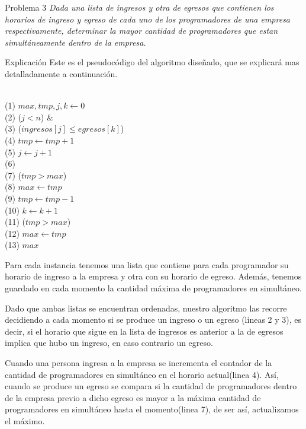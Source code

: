 \begin{section}{Problema 3}
	\textit{Dada una lista de ingresos y otra de egresos que contienen los horarios de ingreso y egreso de cada uno de los programadores de una empresa respectivamente, determinar la mayor cantidad de programadores que estan simultáneamente dentro de la empresa.}
	\begin{subsection}{Explicación}
		Este es el pseudocódigo del algoritmo diseñado, que se explicará mas detalladamente a continuación. 
\\
\\
	\begin{pseudo}
(1)				\tab $max,tmp,j,k \leftarrow 0$ \\
(2)				\tab \WHILE($j< n$) &   \\
(3)				\tab \tab \IF($ingresos[j]\leq egresos[k]$) \\
(4)				\tab \tab \tab $tmp \leftarrow tmp+1$ \\
(5)				\tab \tab \tab $j \leftarrow j+1$ \\
(6)				\tab \tab \ELSE \\
(7)				\tab \tab \tab \IF($tmp>max$) \\
(8)				\tab \tab \tab \tab $max \leftarrow tmp$ \\
(9)				\tab \tab \tab $tmp \leftarrow tmp - 1$ \\				(10)				\tab \tab \tab $k \leftarrow k+1$ \\
(11)				\tab \IF($tmp>max$) \\
(12)				\tab \tab $max \leftarrow tmp$ \\
(13)				\tab \RET $max$
			\end{pseudo}


		Para cada instancia tenemos una lista que contiene para cada programador su horario de ingreso a la empresa y otra con su horario de egreso. Además, tenemos guardado en cada momento la cantidad máxima de programadores en simultáneo.

Dado que ambas listas se encuentran ordenadas, nuestro algoritmo las recorre decidiendo a cada momento si se produce un ingreso o un egreso (lineas 2 y 3), es decir, si el horario que sigue en la lista de ingresos es anterior a la de egresos implica que hubo un ingreso, en caso contrario un egreso.

Cuando una persona ingresa a la empresa se incrementa el contador de la cantidad de programadores en simultáneo en el horario actual(linea 4). Así, cuando se produce un egreso se compara si la cantidad de programadores dentro de la empresa previo a dicho egreso es mayor a la máxima cantidad de programadores en simultáneo hasta el momento(linea 7), de ser así, actualizamos el máximo.


\end{subsection}
\end{section}
